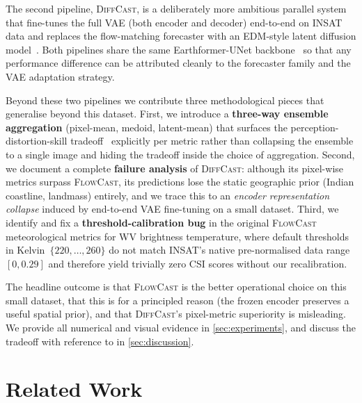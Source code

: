 \documentclass[11pt,a4paper]{article}
\begin{document}
The second pipeline, \textsc{DiffCast}, is a deliberately more ambitious
parallel system that fine-tunes the full {VAE} (both encoder and decoder)
end-to-end on {INSAT} data and replaces the flow-matching forecaster with
an {EDM}-style latent diffusion model~\citep{karras2022edm}. Both pipelines
share the same {Earthformer-UNet} backbone~\citep{gao2022earthformer} so
that any performance difference can be attributed cleanly to the
forecaster family and the {VAE} adaptation strategy.

Beyond these two pipelines we contribute three methodological pieces that
generalise beyond this dataset. First, we introduce a \textbf{three-way
ensemble aggregation} (pixel-mean, medoid, latent-mean) that surfaces the
perception-distortion-skill tradeoff~\citep{blau2018perception} explicitly
per metric rather than collapsing the ensemble to a single image and
hiding the tradeoff inside the choice of aggregation. Second, we document
a complete \textbf{failure analysis} of \textsc{DiffCast}: although its
pixel-wise metrics surpass \textsc{FlowCast}, its predictions lose the
static geographic prior (Indian coastline, landmass) entirely, and we
trace this to an \emph{encoder representation collapse} induced by
end-to-end {VAE} fine-tuning on a small dataset. Third, we identify and
fix a \textbf{threshold-calibration bug} in the original \textsc{FlowCast}
meteorological metrics for WV brightness temperature, where default
thresholds in Kelvin~$\{220,\ldots,260\}$ do not match {INSAT}'s native
pre-normalised data range~$[0,0.29]$ and therefore yield trivially zero
{CSI} scores without our recalibration.

The headline outcome is that \textsc{FlowCast} is the better operational
choice on this small dataset, that this is for a principled reason (the
frozen encoder preserves a useful spatial prior), and that
\textsc{DiffCast}'s pixel-metric superiority is misleading. We provide all
numerical and visual evidence in \cref{sec:experiments}, and discuss the
tradeoff with reference to \citet{blau2018perception} in
\cref{sec:discussion}.

\section{Related Work}
\label{sec:related}
\end{document}
